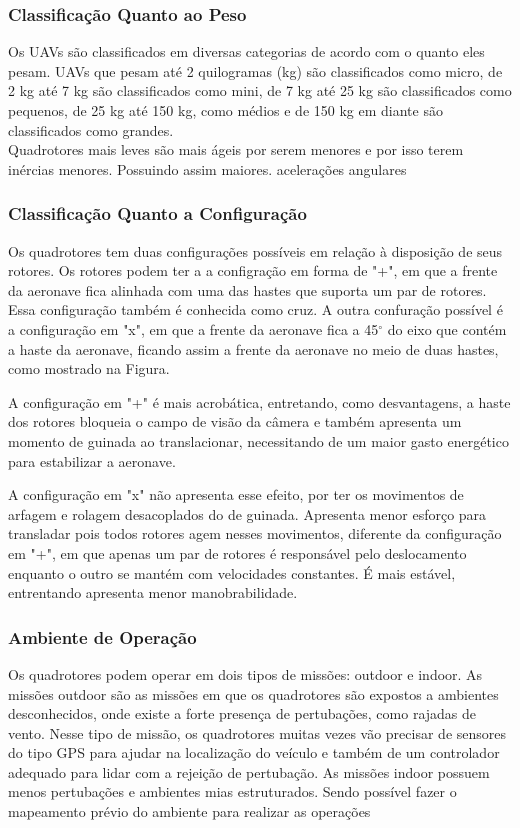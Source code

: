 \subsubsection{Classificação Quanto ao Peso}
Os UAVs são classificados em diversas categorias de acordo com o quanto eles pesam. UAVs que pesam até 2 quilogramas (kg) são classificados como micro, de 2 kg até 7 kg são classificados como mini, de 7 kg até 25 kg são classificados como pequenos, de 25 kg até 150 kg, como médios e de 150 kg em diante são classificados como grandes.\\
Quadrotores mais leves são mais ágeis por serem menores e por isso terem inércias menores. Possuindo assim maiores. acelerações angulares 

\subsubsection{Classificação Quanto a Configuração}
Os quadrotores tem duas configurações possíveis em relação à disposição de seus rotores. Os rotores podem ter a a configração em forma de "+", em que a frente da aeronave fica alinhada com uma das hastes que suporta um par de rotores. Essa configuração também é conhecida como cruz. A outra confuração possível é a configuração em "x", em que a frente da aeronave fica a 45$^{\circ}$ do eixo que contém a haste da aeronave, ficando assim a frente da aeronave no meio de duas hastes, como mostrado na Figura.

A configuração em "+" é mais acrobática, entretando, como desvantagens, a haste dos rotores bloqueia o campo de visão da câmera e também apresenta um momento de guinada ao translacionar, necessitando de um maior gasto energético para estabilizar a aeronave.

A configuração em "x" não apresenta esse efeito, por ter os movimentos de arfagem e rolagem desacoplados do de guinada. Apresenta menor esforço para transladar pois todos rotores agem nesses movimentos, diferente da configuração em "+", em que apenas um par de rotores é responsável pelo deslocamento enquanto o outro se mantém com velocidades constantes. É mais estável, entrentando apresenta menor manobrabilidade.

\subsubsection{Ambiente de Operação}
Os quadrotores podem operar em dois tipos de missões: outdoor e indoor. As missões outdoor são as missões em que os quadrotores são expostos a ambientes desconhecidos, onde existe a forte presença de pertubações, como rajadas de vento. Nesse tipo de missão, os quadrotores muitas vezes vão precisar de sensores do tipo GPS para ajudar na localização do veículo e também de um controlador adequado para lidar com a rejeição de pertubação. As missões indoor possuem menos pertubações e ambientes mias estruturados. Sendo possível fazer o mapeamento prévio do ambiente para realizar as operações 

